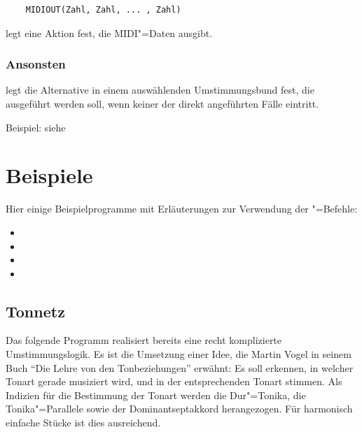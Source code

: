 

\begin{verbatim}
    MIDIOUT(Zahl, Zahl, ... , Zahl)
\end{verbatim}





 legt eine Aktion fest, die MIDI"=Daten ausgibt.


\subsection{Ansonsten}
\label{sec:SX_ELSE}



 legt die Alternative in einem auswählenden Umstimmungsbund 
fest, die ausgeführt werden soll, wenn keiner der direkt angeführten 
Fälle eintritt.


Beispiel: siehe 


\chapter{Beispiele}
\label{sec:SX_EXAMPLES}
Hier einige Beispielprogramme mit Erläuterungen zur Verwendung 
der \mutabor{}"=Befehle:


\begin{itemize}
\item {} 
\item {}
\item {}
\item {}
\end{itemize}




\section{Tonnetz}
\label{sec:EX_TONENET}
Das folgende Programm realisiert bereits eine recht komplizierte 
Umstimmungslogik. Es ist die Umsetzung einer Idee, die Martin 
Vogel in seinem Buch "`Die Lehre von den Tonbeziehungen"' erwähnt: 
Es soll erkennen, in welcher Tonart gerade musiziert wird, und 
in der entsprechenden Tonart  stimmen. Als 
Indizien für die Bestimmung der Tonart werden die Dur"=Tonika, 
die Tonika"=Parallele sowie der Dominantseptakkord herangezogen. 
Für harmonisch einfache Stücke ist dies ausreichend.

